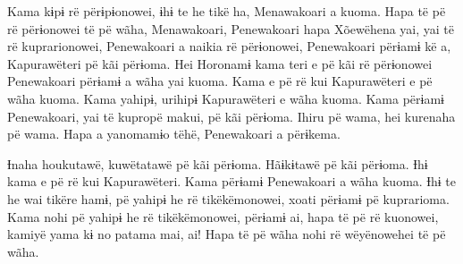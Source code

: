 Kama kɨpɨ rë përɨpɨonowei, ɨhɨ te he tikë ha, Menawakoari a kuoma. Hapa
të pë rë përɨonowei të pë wãha, Menawakoari, Penewakoari hapa Xõewëhena
yai, yai të rë kuprarionowei, Penewakoari a naikia rë përɨonowei,
Penewakoari përɨamɨ kë a, Kapurawëteri pë kãi përɨoma. Hei Horonamɨ kama
teri e pë kãi rë përɨonowei Penewakoari përɨamɨ a wãha yai kuoma. Kama e
pë rë kui Kapurawëteri e pë wãha kuoma. Kama yahipɨ, urihipɨ
Kapurawëteri e wãha kuoma. Kama përɨamɨ Penewakoari, yai të kupropë
makui, pë kãi përɨoma. Ihiru pë wama, hei kurenaha pë wama. Hapa a
yanomamɨo tëhë, Penewakoari a përɨkema. 

Ɨnaha houkutawë, kuwëtatawë pë kãi përɨoma. Hãɨkɨtawë pë kãi përɨoma.
Ɨhɨ kama e pë rë kui Kapurawëteri. Kama përɨamɨ Penewakoari a wãha
kuoma. Ɨhɨ te he wai tikëre hamɨ, pë yahipɨ he rë tikëkëmonowei, xoati
përɨamɨ pë kuprarioma. Kama nohi pë yahipɨ he rë tikëkëmonowei, përɨamɨ
ai, hapa të pë rë kuonowei, kamiyë yama kɨ no patama mai, ai! Hapa të pë
wãha nohi rë wëyënowehei të pë wãha.

 

 
